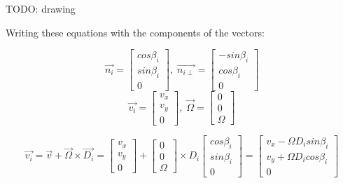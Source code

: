 \documentclass[a4paper]{paper}
\begin{document}
TODO: drawing


Writing these equations with the components of the vectors:

\begin{equation}
    \overrightarrow{n_i} = \begin{bmatrix} cos \beta_i \\ sin \beta_i \\ 0 \end{bmatrix}
    ,\;
    \overrightarrow{n_{i\perp}} = \begin{bmatrix} -sin \beta_i \\ cos \beta_i \\ 0 \end{bmatrix}
\end{equation}
\begin{equation}
    \overrightarrow{v_i} = \begin{bmatrix} v_x \\ v_y \\ 0 \end{bmatrix}
    ,\;
    \overrightarrow{\Omega} = \begin{bmatrix} 0 \\ 0 \\ \Omega \end{bmatrix}
\end{equation}

\begin{equation}
    \overrightarrow{v_i} = \overrightarrow{v} + \overrightarrow{\Omega}\times\overrightarrow{D_i}
    = \begin{bmatrix} v_x \\ v_y \\ 0 \end{bmatrix}
        + \begin{bmatrix} 0 \\ 0 \\ \Omega \end{bmatrix}
        \times D_i \begin{bmatrix} cos \beta_i \\ sin \beta_i \\ 0 \end{bmatrix}
    = \begin{bmatrix}
        v_x - \Omega D_i sin \beta_i \\
        v_y + \Omega D_i cos \beta_i \\
        0
    \end{bmatrix}
\end{equation}
\end{document}
